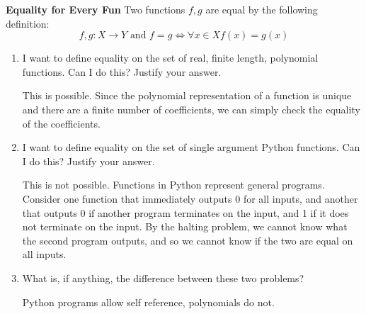 \question \textbf{Equality for Every Fun}\newline
Two functions $f, g$ are equal by the following definition:
\[f, g: X \rightarrow Y \text{ and } f = g \iff \forall x \in X f(x) = g(x) \]
\begin{enumerate}[label=(\alph*)]
\item I want to define equality on the set of real, finite length, polynomial functions. Can I do this? Justify your answer.
\begin{solution}
This is possible. Since the polynomial representation of a function is unique and there are a finite number of coefficients, we can simply check the equality of the coefficients.
\end{solution}

\item I want to define equality on the set of single argument Python functions. Can I do this? Justify your answer.
\begin{solution}
This is not possible. Functions in Python represent general programs. Consider one function that immediately outputs 0 for all inputs, and another that outputs 0 if another program terminates on the input, and 1 if it does not terminate on the input. By the halting problem, we cannot know what the second program outputs, and so we cannot know if the two are equal on all inputs.
\end{solution}

\item What is, if anything, the difference between these two problems?
\begin{solution}
Python programs allow self reference, polynomials do not.
\end{solution}
\end{enumerate}